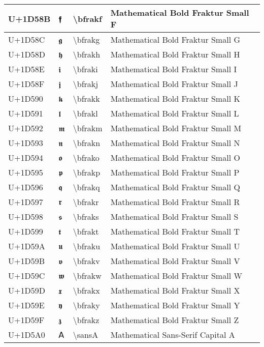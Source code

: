 \begin{table}[h]
\begin{tabulary}{\linewidth}{|L|L|L|L|}
\hline
U+1D58B & 𝖋 & {\textbackslash}bfrakf & Mathematical Bold Fraktur Small F \\
\hline
U+1D58C & 𝖌 & {\textbackslash}bfrakg & Mathematical Bold Fraktur Small G \\
\hline
U+1D58D & 𝖍 & {\textbackslash}bfrakh & Mathematical Bold Fraktur Small H \\
\hline
U+1D58E & 𝖎 & {\textbackslash}bfraki & Mathematical Bold Fraktur Small I \\
\hline
U+1D58F & 𝖏 & {\textbackslash}bfrakj & Mathematical Bold Fraktur Small J \\
\hline
U+1D590 & 𝖐 & {\textbackslash}bfrakk & Mathematical Bold Fraktur Small K \\
\hline
U+1D591 & 𝖑 & {\textbackslash}bfrakl & Mathematical Bold Fraktur Small L \\
\hline
U+1D592 & 𝖒 & {\textbackslash}bfrakm & Mathematical Bold Fraktur Small M \\
\hline
U+1D593 & 𝖓 & {\textbackslash}bfrakn & Mathematical Bold Fraktur Small N \\
\hline
U+1D594 & 𝖔 & {\textbackslash}bfrako & Mathematical Bold Fraktur Small O \\
\hline
U+1D595 & 𝖕 & {\textbackslash}bfrakp & Mathematical Bold Fraktur Small P \\
\hline
U+1D596 & 𝖖 & {\textbackslash}bfrakq & Mathematical Bold Fraktur Small Q \\
\hline
U+1D597 & 𝖗 & {\textbackslash}bfrakr & Mathematical Bold Fraktur Small R \\
\hline
U+1D598 & 𝖘 & {\textbackslash}bfraks & Mathematical Bold Fraktur Small S \\
\hline
U+1D599 & 𝖙 & {\textbackslash}bfrakt & Mathematical Bold Fraktur Small T \\
\hline
U+1D59A & 𝖚 & {\textbackslash}bfraku & Mathematical Bold Fraktur Small U \\
\hline
U+1D59B & 𝖛 & {\textbackslash}bfrakv & Mathematical Bold Fraktur Small V \\
\hline
U+1D59C & 𝖜 & {\textbackslash}bfrakw & Mathematical Bold Fraktur Small W \\
\hline
U+1D59D & 𝖝 & {\textbackslash}bfrakx & Mathematical Bold Fraktur Small X \\
\hline
U+1D59E & 𝖞 & {\textbackslash}bfraky & Mathematical Bold Fraktur Small Y \\
\hline
U+1D59F & 𝖟 & {\textbackslash}bfrakz & Mathematical Bold Fraktur Small Z \\
\hline
U+1D5A0 & 𝖠 & {\textbackslash}sansA & Mathematical Sans-Serif Capital A \\

\end{tabulary}
\end{table}
